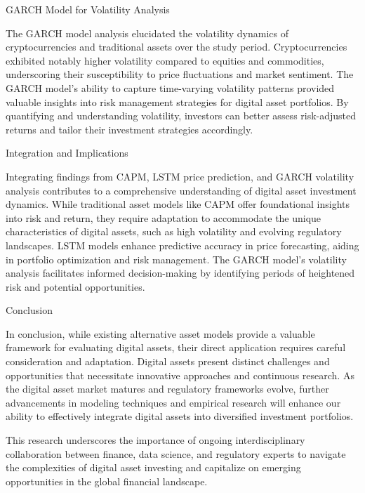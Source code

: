 GARCH Model for Volatility Analysis

The GARCH model analysis elucidated the volatility dynamics of cryptocurrencies and traditional assets over the study period. Cryptocurrencies exhibited notably higher volatility compared to equities and commodities, underscoring their susceptibility to price fluctuations and market sentiment. The GARCH model's ability to capture time-varying volatility patterns provided valuable insights into risk management strategies for digital asset portfolios. By quantifying and understanding volatility, investors can better assess risk-adjusted returns and tailor their investment strategies accordingly.

Integration and Implications

Integrating findings from CAPM, LSTM price prediction, and GARCH volatility analysis contributes to a comprehensive understanding of digital asset investment dynamics. While traditional asset models like CAPM offer foundational insights into risk and return, they require adaptation to accommodate the unique characteristics of digital assets, such as high volatility and evolving regulatory landscapes. LSTM models enhance predictive accuracy in price forecasting, aiding in portfolio optimization and risk management. The GARCH model's volatility analysis facilitates informed decision-making by identifying periods of heightened risk and potential opportunities.

Conclusion

In conclusion, while existing alternative asset models provide a valuable framework for evaluating digital assets, their direct application requires careful consideration and adaptation. Digital assets present distinct challenges and opportunities that necessitate innovative approaches and continuous research. As the digital asset market matures and regulatory frameworks evolve, further advancements in modeling techniques and empirical research will enhance our ability to effectively integrate digital assets into diversified investment portfolios.

This research underscores the importance of ongoing interdisciplinary collaboration between finance, data science, and regulatory experts to navigate the complexities of digital asset investing and capitalize on emerging opportunities in the global financial landscape.







